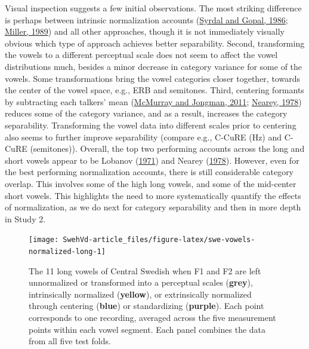 \documentclass[utf8]{frontiersSCNS}
\begin{document}
Visual inspection suggests a few initial observations. The most striking difference is perhaps between intrinsic normalization accounts (\protect\hyperlink{ref-Syrdal1986}{Syrdal and Gopal, 1986}; \protect\hyperlink{ref-miller1989c}{Miller, 1989}) and all other approaches, though it is not immediately visually obvious which type of approach achieves better separability. Second, transforming the vowels to a different perceptual scale does not seem to affect the vowel distributions much, besides a minor decrease in category variance for some of the vowels. Some transformations bring the vowel categories closer together, towards the center of the vowel space, e.g., ERB and semitones. Third, centering formants by subtracting each talkers' mean (\protect\hyperlink{ref-mcmurray-jongman2011}{McMurray and Jongman, 2011}; \protect\hyperlink{ref-nearey1978}{Nearey, 1978}) reduces some of the category variance, and as a result, increases the category separability. Transforming the vowel data into different scales prior to centering also seems to further improve separability (compare e.g., C-CuRE (Hz) and C-CuRE (semitones)). Overall, the top two performing accounts across the long and short vowels appear to be Lobanov (\protect\hyperlink{ref-lobanov1971}{1971}) and Nearey (\protect\hyperlink{ref-nearey1978}{1978}). However, even for the best performing normalization accounts, there is still considerable category overlap. This involves some of the high long vowels, and some of the mid-center short vowels. This highlights the need to more systematically quantify the effects of normalization, as we do next for category separability and then in more depth in Study 2.





\begin{landscape}

\begin{figure}

{\centering \texttt{[image: SwehVd-article\_files/figure-latex/swe-vowels-normalized-long-1]} 

}

\caption{The 11 long vowels of Central Swedish when F1 and F2 are left unnormalized or transformed into a perceptual scales (\textbf{grey}), intrinsically normalized (\textbf{yellow}), or extrinsically normalized through centering (\textbf{blue}) or standardizing (\textbf{purple}). Each point corresponds to one recording, averaged across the five measurement points within each vowel segment. Each panel combines the data from all five test folds.}\label{fig:swe-vowels-normalized-long}
\end{figure}

\end{landscape}
\end{document}
